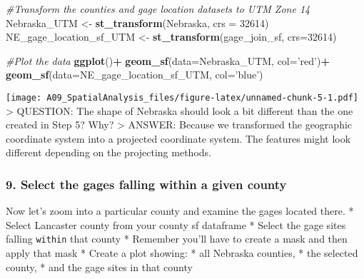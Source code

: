 \documentclass[]{article}
\newenvironment{Shaded}{\begin{snugshade}}{\end{snugshade}}
\newcommand{\KeywordTok}[1]{\textcolor[rgb]{0.13,0.29,0.53}{\textbf{#1}}}
\newcommand{\DataTypeTok}[1]{\textcolor[rgb]{0.13,0.29,0.53}{#1}}
\newcommand{\DecValTok}[1]{\textcolor[rgb]{0.00,0.00,0.81}{#1}}
\newcommand{\StringTok}[1]{\textcolor[rgb]{0.31,0.60,0.02}{#1}}
\newcommand{\CommentTok}[1]{\textcolor[rgb]{0.56,0.35,0.01}{\textit{#1}}}
\newcommand{\OperatorTok}[1]{\textcolor[rgb]{0.81,0.36,0.00}{\textbf{#1}}}
\newcommand{\NormalTok}[1]{#1}
\begin{document}
\begin{Shaded}
\begin{Highlighting}[]
\CommentTok{#Transform the counties and gage location datasets to UTM Zone 14}
\NormalTok{Nebraska_UTM <-}\StringTok{ }\KeywordTok{st_transform}\NormalTok{(Nebraska, }\DataTypeTok{crs =} \DecValTok{32614}\NormalTok{)}
\NormalTok{NE_gage_location_sf_UTM <-}\StringTok{ }\KeywordTok{st_transform}\NormalTok{(gage_join_sf, }\DataTypeTok{crs=}\DecValTok{32614}\NormalTok{)}

\CommentTok{#Plot the data}
\KeywordTok{ggplot}\NormalTok{()}\OperatorTok{+}
\StringTok{  }\KeywordTok{geom_sf}\NormalTok{(}\DataTypeTok{data=}\NormalTok{Nebraska_UTM, }\DataTypeTok{col=}\StringTok{'red'}\NormalTok{)}\OperatorTok{+}
\StringTok{  }\KeywordTok{geom_sf}\NormalTok{(}\DataTypeTok{data=}\NormalTok{NE_gage_location_sf_UTM, }\DataTypeTok{col=}\StringTok{'blue'}\NormalTok{)}
\end{Highlighting}
\end{Shaded}

\texttt{[image: A09\_SpatialAnalysis\_files/figure-latex/unnamed-chunk-5-1.pdf]}
\textgreater{} QUESTION: The shape of Nebraska should look a bit
different than the one created in Step 5? Why? \textgreater{} ANSWER:
Because we transformed the geographic coordinate system into a projected
coordinate system. The features might look different depending on the
projecting methods.

\subsubsection{9. Select the gages falling within a given
county}\label{select-the-gages-falling-within-a-given-county}

Now let's zoom into a particular county and examine the gages located
there. * Select Lancaster county from your county sf dataframe * Select
the gage sites falling \texttt{within} that county * Remember you'll
have to create a mask and then apply that mask * Create a plot showing:
* all Nebraska counties, * the selected county, * and the gage sites in
that county
\end{document}
